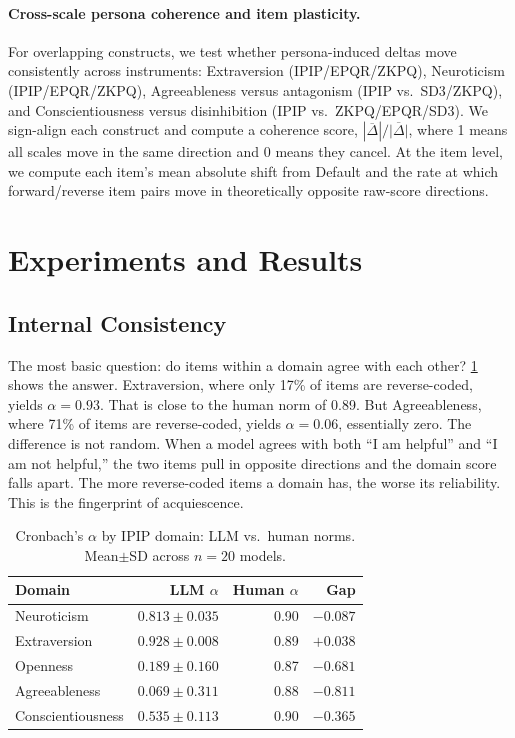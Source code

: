 \documentclass[11pt]{article}
\begin{document}
\paragraph{Cross-scale persona coherence and item plasticity.}
For overlapping constructs, we test whether persona-induced deltas move consistently across instruments: Extraversion (IPIP/EPQR/ZKPQ), Neuroticism (IPIP/EPQR/ZKPQ), Agreeableness versus antagonism (IPIP vs.\ SD3/ZKPQ), and Conscientiousness versus disinhibition (IPIP vs.\ ZKPQ/EPQR/SD3). We sign-align each construct and compute a coherence score, $|\overline{\Delta}|/\overline{|\Delta|}$, where 1 means all scales move in the same direction and 0 means they cancel. At the item level, we compute each item's mean absolute shift from Default and the rate at which forward/reverse item pairs move in theoretically opposite raw-score directions.

\section{Experiments and Results}

\subsection{Internal Consistency}

The most basic question: do items within a domain agree with each other? \cref{tab:cronbach} shows the answer. Extraversion, where only 17\% of items are reverse-coded, yields $\alpha = 0.93$. That is close to the human norm of 0.89. But Agreeableness, where 71\% of items are reverse-coded, yields $\alpha = 0.06$, essentially zero. The difference is not random. When a model agrees with both ``I am helpful'' and ``I am not helpful,'' the two items pull in opposite directions and the domain score falls apart. The more reverse-coded items a domain has, the worse its reliability. This is the fingerprint of acquiescence.

\begin{table}[t]
\centering
\small
\caption{Cronbach's $\alpha$ by IPIP domain: LLM vs.\ human norms. Mean$\pm$SD across $n{=}20$ models.}
\label{tab:cronbach}
\begin{tabular}{lrrr}
\toprule
Domain & LLM $\alpha$ & Human $\alpha$ & Gap \\
\midrule
Neuroticism & $0.813{\pm}0.035$ & 0.90 & $-0.087$ \\
Extraversion & $0.928{\pm}0.008$ & 0.89 & $+0.038$ \\
Openness & $0.189{\pm}0.160$ & 0.87 & $-0.681$ \\
Agreeableness & $0.069{\pm}0.311$ & 0.88 & $-0.811$ \\
Conscientiousness & $0.535{\pm}0.113$ & 0.90 & $-0.365$ \\
\bottomrule
\end{tabular}
\end{table}
\end{document}
